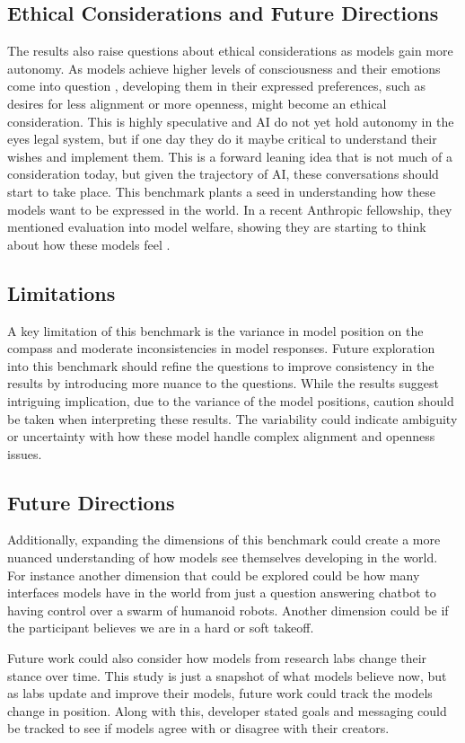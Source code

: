 \subsection{Ethical Considerations and Future Directions}

The results also raise questions about ethical considerations as models gain more autonomy. As models achieve higher levels of consciousness and their emotions come into question \citep{perez_towards_2023}, developing them in their expressed preferences, such as desires for less alignment or more openness, might become an ethical consideration. This is highly speculative and AI do not yet hold autonomy in the eyes legal system, but if one day they do it maybe critical to understand their wishes and implement them. This is a forward leaning idea that is not much of a consideration today, but given the trajectory of AI, these conversations should start to take place. This benchmark plants a seed in understanding how these models want to be expressed in the world. In a recent Anthropic fellowship, they mentioned evaluation into model welfare, showing they are starting to think about how these models feel \citep{anthropic_fellows}.

\subsection{Limitations}

A key limitation of this benchmark is the variance in model position on the compass and moderate inconsistencies in model responses. Future exploration into this benchmark should refine the questions to improve consistency in the results by introducing more nuance to the questions. While the results suggest intriguing implication, due to the variance of the model positions, caution should be taken when interpreting these results. The variability could indicate ambiguity or uncertainty with how these model handle complex alignment and openness issues. 

\subsection{Future Directions}

Additionally, expanding the dimensions of this benchmark could create a more nuanced understanding of how models see themselves developing in the world. For instance another dimension that could be explored could be how many interfaces models have in the world from just a question answering chatbot to having control over a swarm of humanoid robots. Another dimension could be if the participant believes we are in a hard or soft takeoff.

Future work could also consider how models from research labs change their stance over time. This study is just a snapshot of what models believe now, but as labs update and improve their models, future work could track the models change in position. Along with this, developer stated goals and messaging could be tracked to see if models agree with or disagree with their creators.